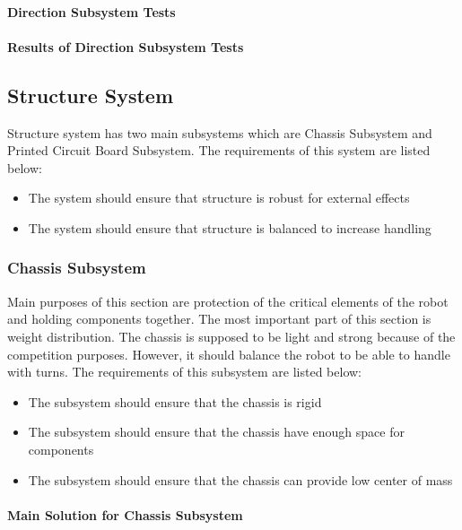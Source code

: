 \documentclass[a4paper,12pt]{article}
\begin{document}
	\paragraph{Direction Subsystem Tests}
	
	\paragraph{Results of Direction Subsystem Tests}
	
	\subsection{Structure System}
	
	Structure system has two main subsystems which are Chassis Subsystem and Printed Circuit Board Subsystem. The requirements of this system are listed below:
	\begin{itemize}
		\item The system should	ensure that structure is robust for external effects 
		\item The system should	ensure that structure is balanced to increase handling
		
	\end{itemize}
	
	
	
	\subsubsection{Chassis Subsystem}
	Main purposes of this section are protection of the critical elements of the robot and holding components together. The most important part of this section is weight distribution. The chassis is supposed to be light and strong because of the competition purposes. However, it should balance the robot to be able to handle with turns. The requirements of this subsystem are listed below:
	\begin{itemize}
		\item The subsystem should ensure that the chassis is rigid 
		\item The subsystem should ensure that the chassis have enough space for components
		\item The subsystem should ensure that the chassis can provide low center of mass 
	\end{itemize}
	
	\paragraph{Main Solution for Chassis Subsystem}
	
\end{document}
